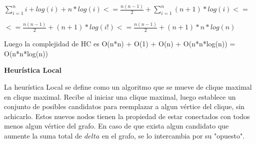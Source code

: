 $\displaystyle \sum_{i=1}^{n} i + log(i) + n*log(i) <= \frac{n(n-1)}{2}+\sum_{i=1}^{n} (n+1)*log(i) <=$  
 
$\displaystyle  <= \frac{n(n-1)}{2}+(n+1)*log(i!) <= \frac{n(n-1)}{2}+(n+1)*n*log(n) $

Luego la complejidad de HC es O(n*n) + O(1) + O(n) + O(n*n*log(n)) = O(n*n*log(n))  

\textbf{Heurística Local}

La heurística Local se define como un algoritmo que se mueve de clique maximal en clique maximal. Recibe al iniciar una clique maximal, luego establece un conjunto de posibles candidatos para reemplazar a algun vértice del clique, sin achicarlo. Estos nuevos nodos tienen la propiedad de estar conectados con todos menos algun vértice del grafo. En caso de que exista algun candidato que aumente la suma total de $delta$ en el grafo, se lo intercambia por su "opuesto".

